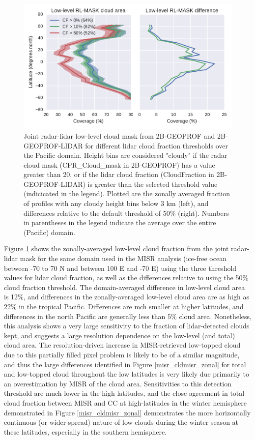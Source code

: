 \begin{figure}
\centering
\includegraphics[width=\columnwidth]{graphics/misr_rlmask_test.pdf}
\caption{Joint radar-lidar low-level cloud mask from 2B-GEOPROF and 2B-GEOPROF-LIDAR for different lidar cloud fraction thresholds over the Pacific domain. Height bins are considered "cloudy" if the radar cloud mask (CPR\_Cloud\_mask in 2B-GEOPROF) has a value greater than 20, or if the lidar cloud fraction (CloudFraction in 2B-GEOPROF-LIDAR) is greater than the selected threshold value (indicicated in the legend). Plotted are the zonally averaged fraction of profiles with any cloudy height bins below 3 km (left), and differences relative to the default threshold of 50\% (right). Numbers in parentheses in the legend indicate the average over the entire (Pacific) domain.}
\label{misr_rlmask_test}
\end{figure}

Figure \ref{misr_rlmask_test} shows the zonally-averaged low-level cloud fraction from the joint radar-lidar mask for the same domain used in the MISR analysis (ice-free ocean between -70 to 70 N and between 100 E and -70 E) using the three threshold values for lidar cloud fraction, as well as the differences relative to using the 50\% cloud fraction threshold. The domain-averaged difference in low-level cloud area is 12\%, and differences in the zonally-averaged low-level cloud area are as high as 22\% in the tropical Pacific. Differences are mch smaller at higher latitudes, and differences in the north Pacific are generally less than 5\% cloud area. Nonetheless, this analysis shows a very large sensitivity to the fraction of lidar-detected clouds kept, and suggests a large resolution dependence on the low-level (and total) cloud area. The resolution-driven increase in MISR-retrieved low-topped cloud due to this partially filled pixel problem is likely to be of a similar magnitude, and thus the large differences identified in Figure \ref{misr_cldmisr_zonal} for total and low-topped cloud throughout the low latitudes is very likely due primarily to an overestimation by MISR of the cloud area. Sensitivities to this detection threshold are much lower in the high latitudes, and the close agreement in total cloud fraction between MISR and CC at high-latitudes in the winter hemisphere demonstrated in Figure \ref{misr_cldmisr_zonal} demonstrates the more horizontally continuous (or wider-spread) nature of low clouds during the winter season at these latitudes, especially in the southern hemisphere.

